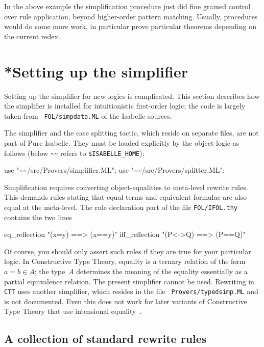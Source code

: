 \medskip

In the above example the simplification procedure just did fine
grained control over rule application, beyond higher-order pattern
matching.  Usually, procedures would do some more work, in particular
prove particular theorems depending on the current redex.


\section{*Setting up the simplifier}\label{sec:setting-up-simp}

Setting up the simplifier for new logics is complicated.  This section
describes how the simplifier is installed for intuitionistic
first-order logic; the code is largely taken from {\tt
  FOL/simpdata.ML} of the Isabelle sources.

The simplifier and the case splitting tactic, which reside on separate files,
are not part of Pure Isabelle.  They must be loaded explicitly by the
object-logic as follows (below \texttt{\~\relax\~\relax} refers to
\texttt{\$ISABELLE_HOME}):
\begin{ttbox}
use "\~\relax\~\relax/src/Provers/simplifier.ML";
use "\~\relax\~\relax/src/Provers/splitter.ML";
\end{ttbox}

Simplification requires converting object-equalities to meta-level rewrite
rules.  This demands rules stating that equal terms and equivalent formulae
are also equal at the meta-level.  The rule declaration part of the file
\texttt{FOL/IFOL.thy} contains the two lines
\begin{ttbox}
eq_reflection   "(x=y)   ==> (x==y)"
iff_reflection  "(P<->Q) ==> (P==Q)"
\end{ttbox}
Of course, you should only assert such rules if they are true for your
particular logic.  In Constructive Type Theory, equality is a ternary
relation of the form $a=b\in A$; the type~$A$ determines the meaning
of the equality essentially as a partial equivalence relation.  The
present simplifier cannot be used.  Rewriting in \texttt{CTT} uses
another simplifier, which resides in the file {\tt
  Provers/typedsimp.ML} and is not documented.  Even this does not
work for later variants of Constructive Type Theory that use
intensional equality~\cite{nordstrom90}.


\subsection{A collection of standard rewrite rules}


